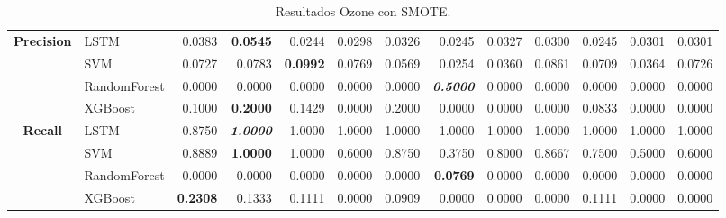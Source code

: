 \begin{table}[H]
\begin{adjustbox}{max width=12cm}
\begin{tabular}{|c|l|r|r|r|r|r|r|r|r|r|r|r|}
			\hline
			\textbf{Precision} &  LSTM &  0.0383 & \textbf{  0.0545 } &  0.0244 &  0.0298 &  0.0326 &  0.0245 &  0.0327 &  0.0300 &  0.0245 &  0.0301 &  0.0301 \\
			&  SVM &  0.0727 &  0.0783 & \textbf{  0.0992 } &  0.0769 &  0.0569 &  0.0254 &  0.0360 &  0.0861 &  0.0709 &  0.0364 &  0.0726 \\
			&  RandomForest &  0.0000 &  0.0000 &  0.0000 &  0.0000 &  0.0000 & \textit{ \textbf{  0.5000 } } &  0.0000 &  0.0000 &  0.0000 &  0.0000 &  0.0000 \\
			&  XGBoost &  0.1000 & \textbf{  0.2000 } &  0.1429 &  0.0000 &  0.2000 &  0.0000 &  0.0000 &  0.0000 &  0.0833 &  0.0000 &  0.0000 \\
			\hline
			\textbf{Recall} &  LSTM &  0.8750 & \textit{ \textbf{  1.0000 } } &  1.0000 &  1.0000 &  1.0000 &  1.0000 &  1.0000 &  1.0000 &  1.0000 &  1.0000 &  1.0000 \\
			&  SVM &  0.8889 & \textbf{  1.0000 } &  1.0000 &  0.6000 &  0.8750 &  0.3750 &  0.8000 &  0.8667 &  0.7500 &  0.5000 &  0.6000 \\
			&  RandomForest &  0.0000 &  0.0000 &  0.0000 &  0.0000 &  0.0000 & \textbf{  0.0769 } &  0.0000 &  0.0000 &  0.0000 &  0.0000 &  0.0000 \\
			&  XGBoost & \textbf{  0.2308 } &  0.1333 &  0.1111 &  0.0000 &  0.0909 &  0.0000 &  0.0000 &  0.0000 &  0.1111 &  0.0000 &  0.0000 \\
			\hline
		\end{tabular}
	\end{adjustbox}
	\caption{Resultados Ozone con SMOTE.}
	\label{tab:Ozone_SMOTE}
\end{table}

